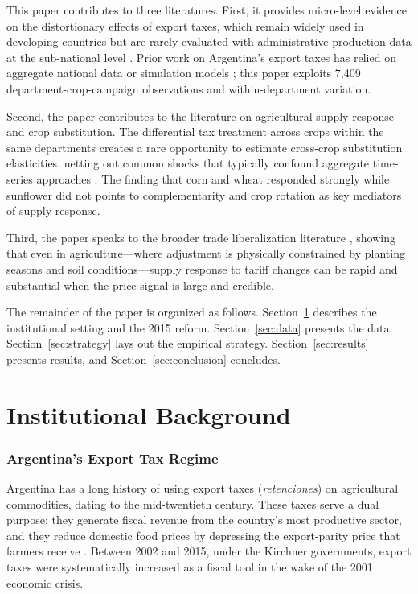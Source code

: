 \documentclass[12pt]{article}
\begin{document}
This paper contributes to three literatures. First, it provides micro-level evidence on the distortionary effects of export taxes, which remain widely used in developing countries but are rarely evaluated with administrative production data at the sub-national level \citep{nogues2008, olarreaga2006, laborde2013}. Prior work on Argentina's export taxes has relied on aggregate national data or simulation models \citep{livanis2006, lence2018}; this paper exploits 7,409 department-crop-campaign observations and within-department variation.

Second, the paper contributes to the literature on agricultural supply response and crop substitution. The differential tax treatment across crops within the same departments creates a rare opportunity to estimate cross-crop substitution elasticities, netting out common shocks that typically confound aggregate time-series approaches \citep{chavas2001}. The finding that corn and wheat responded strongly while sunflower did not points to complementarity and crop rotation as key mediators of supply response.

Third, the paper speaks to the broader trade liberalization literature \citep{goldberg2010, topalova2010, bustos2011}, showing that even in agriculture---where adjustment is physically constrained by planting seasons and soil conditions---supply response to tariff changes can be rapid and substantial when the price signal is large and credible.

The remainder of the paper is organized as follows. Section~\ref{sec:background} describes the institutional setting and the 2015 reform. Section~\ref{sec:data} presents the data. Section~\ref{sec:strategy} lays out the empirical strategy. Section~\ref{sec:results} presents results, and Section~\ref{sec:conclusion} concludes.


\section{Institutional Background}
\label{sec:background}

\subsubsection*{Argentina's Export Tax Regime} Argentina has a long history of using export taxes (\textit{retenciones}) on agricultural commodities, dating to the mid-twentieth century. These taxes serve a dual purpose: they generate fiscal revenue from the country's most productive sector, and they reduce domestic food prices by depressing the export-parity price that farmers receive \citep{nogues2008}. Between 2002 and 2015, under the Kirchner governments, export taxes were systematically increased as a fiscal tool in the wake of the 2001 economic crisis.
\end{document}
